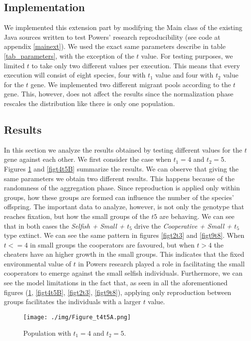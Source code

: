 \documentclass[runningheads]{llncs}
\begin{document}
\subsection{Implementation}
We implemented this extension part by modifying the Main class of the
existing Java sources written to test Powers' research
reproducibility (see code at appendix \ref{mainext}). We used the
exact same parameters describe in table \ref{tab_parameters}, with the
exception of the $t$ value. For testing
purposes, we limited $t$ to take only two different values per
execution. This means that every execution will consist of eight species,
four with $t_1$ value and four with $t_2$ value for the $t$ gene. We
implemented two different migrant pools according to the $t$
gene. This, however, does not affect the results since the
normalization phase rescales the distribution like there is only one
population. 

\subsection{Results}
In this section we analyze the results obtained by testing different
values for the $t$ gene against each other. We first consider the case
when $t_1 = 4$ and $t_2 = 5$. Figures \ref{figt4t5A} and \ref{figt4t5B}
summarize the results. We can observe that giving the same parameters
we obtain two different results. This happens because of the
randomness of the aggregation phase. Since reproduction is applied
only within groups, how these groups are formed can influence the
number of the species' offspring. The important data to analyze,
however, is not only the genotype that reaches fixation, but how the small
groups of the $t5$ are behaving. We can see that in both cases the
\textit{Selfish + Small + $t_5$} drive the \textit{Cooperative +
Small + $t_5$} type extinct. We can see the same pattern in figures
\ref{figt2t3} and \ref{figt9t8}. When $t <= 4$ in small groups the
cooperators are favoured, but when $t > 4$ the cheaters have an higher
growth in the small groups. This indicates that the fixed
environmental value of $t$ in Powers research played a role in
facilitating the small cooperators to emerge against the small selfish
individuals. Furthermore, we can see the model limitations in the fact
that, as seen in all the aforementioned figures (\ref{figt4t5A},
\ref{figt4t5B}, \ref{figt2t3}, \ref{figt9t8}), applying only
reproduction between groups facilitates the individuals with a larger
$t$ value.

\begin{figure}
\texttt{[image: ./img/Figure\_t4t5A.png]}
\caption{Population with $t_1 = 4$ and $t_2 = 5$.} \label{figt4t5A}
\end{figure}
\end{document}
